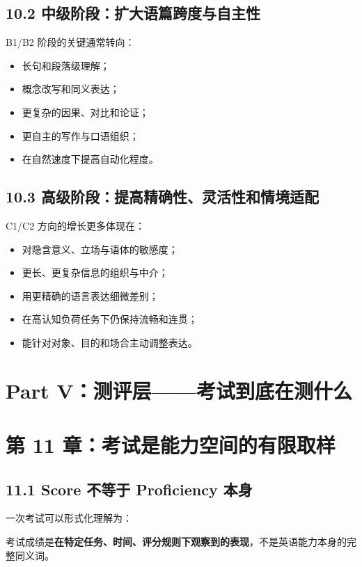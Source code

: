 \documentclass[11pt,a4paper]{ctexart}
\newcommand{\kw}[1]{\textbf{#1}}
\begin{document}
\subsection{10.2 中级阶段：扩大语篇跨度与自主性}
B1/B2 阶段的关键通常转向：
\begin{itemize}
  \item 长句和段落级理解；
  \item 概念改写和同义表达；
  \item 更复杂的因果、对比和论证；
  \item 更自主的写作与口语组织；
  \item 在自然速度下提高自动化程度。
\end{itemize}

\subsection{10.3 高级阶段：提高精确性、灵活性和情境适配}
C1/C2 方向的增长更多体现在：
\begin{itemize}
  \item 对隐含意义、立场与语体的敏感度；
  \item 更长、更复杂信息的组织与中介；
  \item 用更精确的语言表达细微差别；
  \item 在高认知负荷任务下仍保持流畅和连贯；
  \item 能针对对象、目的和场合主动调整表达。
\end{itemize}

\newpage
\section{Part V：测评层——考试到底在测什么}

\section{第 11 章：考试是能力空间的有限取样}

\subsection{11.1 Score 不等于 Proficiency 本身}
一次考试可以形式化理解为：
\begin{center}
\end{center}
考试成绩是\kw{在特定任务、时间、评分规则下观察到的表现}，不是英语能力本身的完整同义词。
\end{document}
